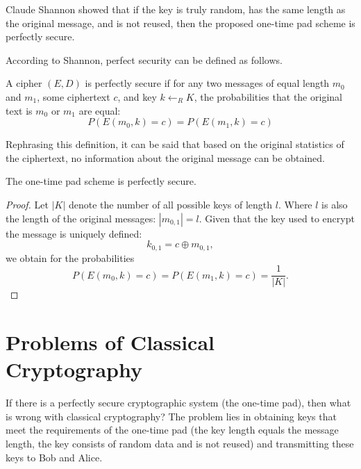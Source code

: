 Claude Shannon showed \cite{bShenonCrypto} that if the key is truly random, has the same length as the original message, and is not reused, then the proposed one-time pad scheme is perfectly secure.

According to Shannon, perfect security can be defined as follows.
\begin{definition}
A cipher $\left(E, D\right)$ is perfectly secure if for any two messages of equal length $m_0$ and $m_1$, some ciphertext $c$, and key $k \leftarrow_R K$, the probabilities that the original text is $m_0$ or $m_1$ are equal:
\begin{equation}
P\left(E\left(m_0, k\right) = c \right) = 
P\left(E\left(m_1, k\right) = c \right)
\nonumber
\end{equation}
\end{definition}
Rephrasing this definition, it can be said that based on the original statistics of the ciphertext, no information about the original message can be obtained.

\begin{theorem}
The one-time pad scheme is perfectly secure.
\end{theorem}

\begin{proof}
Let $\left|K\right|$ denote the number of all possible keys of length $l$. Where $l$ is also the length of the original messages: $\left|m_{0,1}\right| = l$. Given that the key used to encrypt the message is uniquely defined:
\begin{equation}
k_{0,1} = c \oplus m_{0,1},
\nonumber
\end{equation} 
we obtain for the probabilities
\begin{equation}
P\left(E\left(m_0, k\right) = c \right) = 
P\left(E\left(m_1, k\right) = c \right) = 
\frac{1}{\left|K\right|}.
\nonumber
\end{equation}
\end{proof}

\section{Problems of Classical Cryptography}

If there is a perfectly secure cryptographic system (the one-time pad), then what is wrong with classical cryptography? The problem lies in obtaining keys that meet the requirements of the one-time pad (the key length equals the message length, the key consists of random data and is not reused) and transmitting these keys to Bob and Alice.

